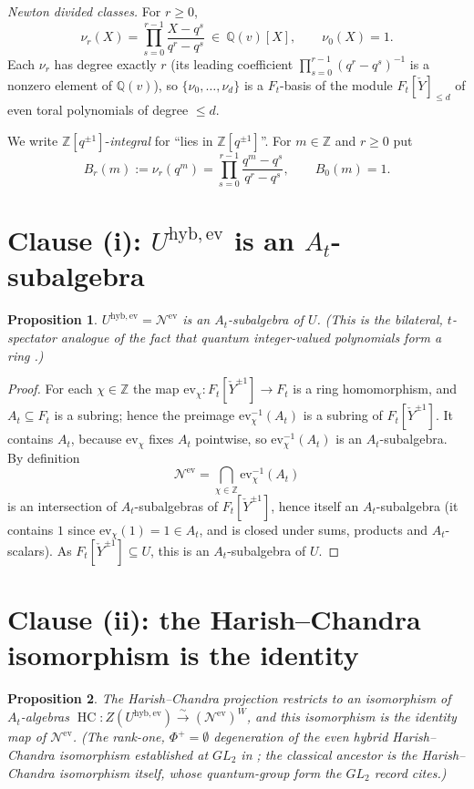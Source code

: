\documentclass[11pt]{article}
\newtheorem{proposition}{Proposition}
\newcommand{\At}{A_t}
\newcommand{\Ft}{F_t}
\newcommand{\Nev}{\mathcal N^{\mathrm{ev}}}
\newcommand{\Uev}{U^{\mathrm{hyb,ev}}}
\newcommand{\HC}{\operatorname{HC}}
\newcommand{\Yc}{\check Y}
\newcommand{\Z}{\mathbb Z}
\newcommand{\ev}{\mathrm{ev}}
\begin{document}
\emph{Newton divided classes.}\;
For $r\ge0$,
\[
  \nu_{r}(X)=\prod_{s=0}^{r-1}\frac{X-q^{s}}{q^{r}-q^{s}}\ \in\ \mathbb Q(v)[X],
  \qquad \nu_0(X)=1 .
\]
Each $\nu_r$ has degree exactly $r$ (its leading coefficient
$\prod_{s=0}^{r-1}(q^{r}-q^{s})^{-1}$ is a nonzero element of $\mathbb Q(v)$),
so $\{\nu_0,\dots,\nu_d\}$ is a $\Ft$-basis of the module
$\Ft[\Yc]_{\le d}$ of even toral polynomials of degree $\le d$.

\medskip
We write $\Z[q^{\pm1}]$-\emph{integral} for ``lies in $\Z[q^{\pm1}]$''.
For $m\in\Z$ and $r\ge0$ put
\[
  B_r(m):=\nu_r(q^{m})=\prod_{s=0}^{r-1}\frac{q^{m}-q^{s}}{q^{r}-q^{s}},
  \qquad B_0(m)=1 .
\]

\section{Clause (i): $\Uev$ is an $\At$-subalgebra}

\begin{proposition}
$\Uev=\Nev$ is an $\At$-subalgebra of $U$. (This is the bilateral,
$t$-spectator analogue of the fact that quantum integer-valued polynomials
form a ring \cite[\S1]{HarmanHopkins}.)
\end{proposition}

\begin{proof}
For each $\chi\in\Z$ the map $\ev_\chi\colon\Ft[\Yc^{\pm1}]\to\Ft$ is a ring
homomorphism, and $\At\subseteq\Ft$ is a subring; hence the preimage
$\ev_\chi^{-1}(\At)$ is a subring of $\Ft[\Yc^{\pm1}]$. It contains $\At$,
because $\ev_\chi$ fixes $\At$ pointwise, so $\ev_\chi^{-1}(\At)$ is an
$\At$-subalgebra. By definition
\[
  \Nev=\bigcap_{\chi\in\Z}\ev_\chi^{-1}(\At)
\]
is an intersection of $\At$-subalgebras of $\Ft[\Yc^{\pm1}]$, hence itself an
$\At$-subalgebra (it contains $1$ since $\ev_\chi(1)=1\in\At$, and is closed
under sums, products and $\At$-scalars). As $\Ft[\Yc^{\pm1}]\subseteq U$, this
is an $\At$-subalgebra of $U$.
\end{proof}

\section{Clause (ii): the Harish--Chandra isomorphism is the identity}

\begin{proposition}
The Harish--Chandra projection restricts to an isomorphism of $\At$-algebras
$\HC\colon Z(\Uev)\xrightarrow{\ \sim\ }(\Nev)^{W}$, and this isomorphism is the
identity map of $\Nev$. (The rank-one, $\Phi^{+}=\emptyset$ degeneration of the
even hybrid Harish--Chandra isomorphism established at $GL_2$ in
\cite{SandboxGL2}; the classical ancestor is the Harish--Chandra isomorphism
itself, whose quantum-group form the $GL_2$ record cites.)
\end{proposition}
\end{document}
